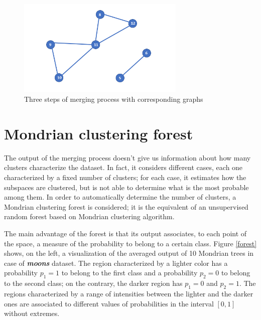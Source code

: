 \documentclass[a4paper]{article}
\begin{document}
\begin{figure}[H]
        \includegraphics[width=8cm]{grafici/2blobs_4_2_G.png} 
\caption{Three steps of merging process with corresponding graphs}
        \label{merging}
    \end{figure}   


\newpage
\section{Mondrian clustering forest}


The output of the merging process doesn't give us information about how many clusters characterize the dataset.
In fact, it considers different cases, each one characterized by a fixed number of clusters;
for each case, it estimates how the subspaces are clustered, but is not able to determine what is the most probable among them.
In order to automatically determine the number of clusters, a Mondrian clustering forest is considered;
it is the equivalent of an unsupervised random forest based on Mondrian clustering algorithm.

The main advantage of the forest is that its output associates, to each point of the space, a measure of the probability to belong to a certain class.
Figure \ref{forest} shows, on the left, a visualization of the averaged output of 10 Mondrian trees in case of \emph{\textbf{moons}} dataset.
The region characterized by a lighter color has a probability $p_1 = 1$ to belong to the first class and a probability $p_2 = 0$ to belong to the second class;
on the contrary, the darker region has $p_1 = 0$ and $p_2 = 1$.
The regions characterized by a range of intensities between the lighter and the darker ones are associated to different values of probabilities in the interval $[0,1]$ without extremes.
\end{document}
